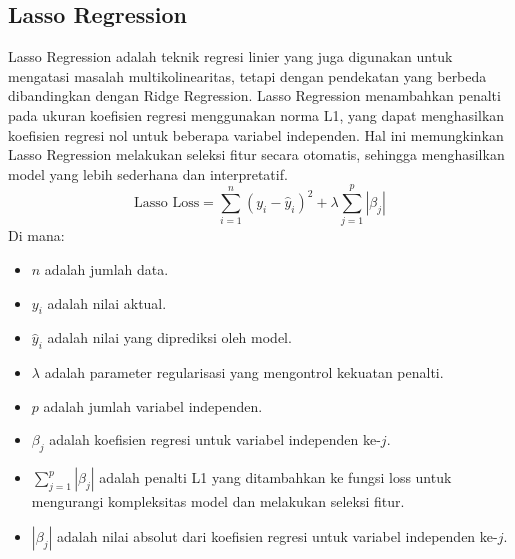 \subsection{Lasso Regression}
Lasso Regression adalah teknik regresi linier yang juga digunakan untuk mengatasi masalah multikolinearitas, tetapi dengan pendekatan yang berbeda dibandingkan dengan Ridge Regression. Lasso Regression menambahkan penalti pada ukuran koefisien regresi menggunakan norma L1, yang dapat menghasilkan koefisien regresi nol untuk beberapa variabel independen. Hal ini memungkinkan Lasso Regression melakukan seleksi fitur secara otomatis, sehingga menghasilkan model yang lebih sederhana dan interpretatif.
\begin{equation}
    \text{Lasso Loss} = \sum_{i=1}^{n} (y_i - \hat{y}_i)^2 + \lambda \sum_{j=1}^{p} |\beta_j|
\end{equation}
Di mana:
\begin{itemize}
    \item $n$ adalah jumlah data.
    \item $y_i$ adalah nilai aktual.
    \item $\hat{y}_i$ adalah nilai yang diprediksi oleh model.
    \item $\lambda$ adalah parameter regularisasi yang mengontrol kekuatan penalti.
    \item $p$ adalah jumlah variabel independen.
    \item $\beta_j$ adalah koefisien regresi untuk variabel independen ke-$j$.
    \item $\sum_{j=1}^{p} |\beta_j|$ adalah penalti L1 yang ditambahkan ke fungsi loss untuk mengurangi kompleksitas model dan melakukan seleksi fitur.
    \item $|\beta_j|$ adalah nilai absolut dari koefisien regresi untuk variabel independen ke-$j$.
\end{itemize}

